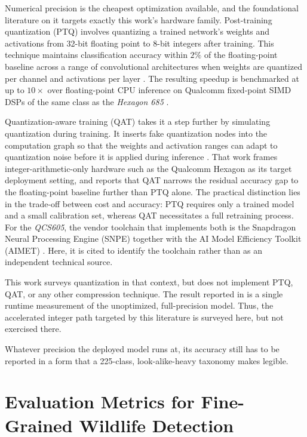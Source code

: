 Numerical precision is the cheapest optimization available, and the foundational literature on it targets exactly this work's hardware family. Post-training quantization (PTQ) involves quantizing a trained network's weights and activations from 32-bit floating point to 8-bit integers after training. This technique maintains classification accuracy within $2\%$ of the floating-point baseline across a range of convolutional architectures when weights are quantized per channel and activations per layer \cite{krishnamoorthiQuantizingDeepConvolutional2018}. The resulting speedup is benchmarked at up to $10\times$ over floating-point CPU inference on Qualcomm fixed-point SIMD DSPs of the same class as the \textit{Hexagon 685} \cite{krishnamoorthiQuantizingDeepConvolutional2018}.

Quantization-aware training (QAT) takes it a step further by simulating quantization during training. It inserts fake quantization nodes into the computation graph so that the weights and activation ranges can adapt to quantization noise before it is applied during inference \cite{jacobQuantizationTrainingNeural2018}. That work frames integer-arithmetic-only hardware such as the Qualcomm Hexagon as its target deployment setting, and reports that QAT narrows the residual accuracy gap to the floating-point baseline further than PTQ alone. The practical distinction lies in the trade-off between cost and accuracy: PTQ requires only a trained model and a small calibration set, whereas QAT necessitates a full retraining process. For the \textit{QCS605}, the vendor toolchain that implements both is the Snapdragon Neural Processing Engine (SNPE) together with the AI Model Efficiency Toolkit (AIMET) \cite{QualcommAimet2026}. Here, it is cited to identify the toolchain rather than as an independent technical source.

This work surveys quantization in that context, but does not implement PTQ, QAT, or any other compression technique. The result reported in  is a single runtime measurement of the unoptimized, full-precision model. Thus, the accelerated integer path targeted by this literature is surveyed here, but not exercised there.

Whatever precision the deployed model runs at, its accuracy still has to be reported in a form that a 225-class, look-alike-heavy taxonomy makes legible.

\section{Evaluation Metrics for Fine-Grained Wildlife Detection}\label{sec:lit_evaluation_metrics}

